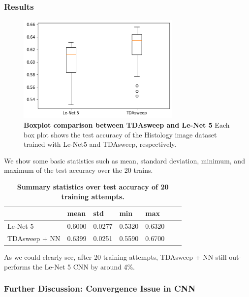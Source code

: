 \documentclass{article}
\begin{document}
\subsubsection{Results}

\begin{figure}[!ht]
\centering
\includegraphics[width=8cm]{lenet_vs_tdasweep.png}
\caption{{\bf Boxplot comparison between TDAsweep and Le-Net 5} Each box plot shows the test accuracy of the Histology image dataset trained with Le-Net5 and TDAsweep, respectively.}
\label{lenet_tdasweep}
\end{figure}

We show some basic statistics such as mean, standard deviation, minimum, and maximum of the test accuracy over the 20 trains.
\begin{table}[!ht]
\centering
\caption{{\bf Summary statistics over test accuracy of 20 training attempts.}}
\begin{tabular}{|l|l|l|l|l|l|l|}
\hline
\multicolumn{1}{|l|}{} & \multicolumn{1}{|l|}{\bf mean} & \multicolumn{1}{|l|}{\bf std} & \multicolumn{1}{|l|}{\bf min}& \multicolumn{1}{|l|}{\bf max}\\ \hline
Le-Net 5 & 0.6000 & 0.0277 & 0.5320 & 0.6320 \\ \hline
TDAsweep + NN & 0.6399 & 0.0251 & 0.5590 & 0.6700 \\ \hline

\end{tabular}
\label{tda_aug}
\end{table}

As we could clearly see, after 20 training attempts, TDAsweep + NN still out-performs the Le-Net 5 CNN by around 4\%.

\subsubsection{Further Discussion: Convergence Issue in CNN}
\end{document}
